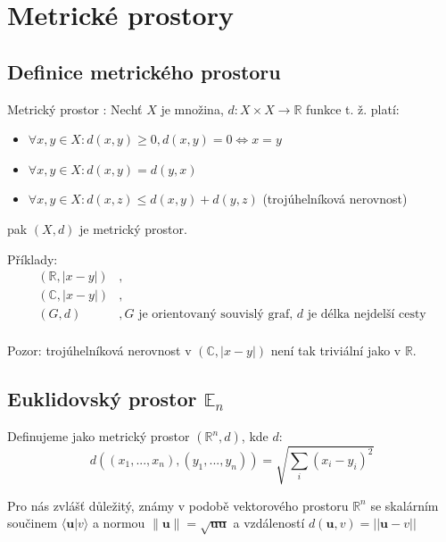 \documentclass[../main.tex]{subfiles}
\begin{document}
\section{Metrické prostory}
\subsection{Definice metrického prostoru}
\hspace{1.2mm}
Metrický prostor : Nechť $X$ je množina,  $d: X \times X \rightarrow \mathbb{R}$ funkce t. ž. platí:

\begin{itemize}
\item{$\forall x,y \in X : d(x,y) \geq 0, d(x,y) = 0 \iff x = y$ }
\item{$\forall x,y \in X : d(x,y) = d(y,x)$}
\item{$\forall x,y \in X : d(x,z) \leq d(x,y) + d(y,z)$ (trojúhelníková nerovnost)}
\end{itemize}
pak $(X,d)$ je metrický prostor.

\noindent
\hspace{1.2mm}
Příklady:
\begin{align*} 
    (\mathbb{R}, |x-y|) &,\\
    (\mathbb{C},|x-y|) &,\\
    (G,d) &, G \text{ je orientovaný souvislý graf, } d \text{ je délka nejdelší cesty}\\
\end{align*}

\hspace{1.2mm}
Pozor: trojúhelníková nerovnost v $(\mathbb{C}, |x-y|)$ není tak triviální jako v $\mathbb{R}$.

\subsection{Euklidovský prostor $\mathbb{E}_n$}
\hspace{1.2mm}
Definujeme jako metrický prostor $(\mathbb{R}^n,d)$, kde $d$:
\[d((x_1,...,x_n),(y_1,...,y_n)) = \sqrt{\sum_i(x_i-y_i)^2}\]

Pro nás zvlášť důležitý, známy v podobě vektorového prostoru $\mathbb{R}^n$ se skalárním součinem $\langle \textbf{u} | v \rangle$ a normou
$\|\textbf{u}\| = \sqrt{\textbf{uu}}$ a vzdáleností $d(\textbf{u},v) = ||\textbf{u}-v||$
\noindent
\end{document}

